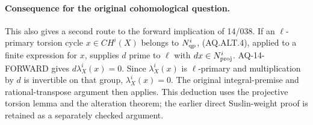 \paragraph{Consequence for the original cohomological question.}
This also gives a second route to the forward implication
of 14/038.  If an $\ell$-primary torsion cycle
$x\in CH^i(X)$ belongs to $N^i_{\rm qp}$, (AQ.ALT.4),
applied to a finite expression for $x$, supplies
$d$ prime to $\ell$ with $dx\in N^i_{\rm proj}$.
AQ-14-FORWARD gives $d\lambda_X^i(x)=0$.
Since $\lambda_X^i(x)$ is $\ell$-primary and
multiplication by $d$ is invertible on that group,
$\lambda_X^i(x)=0$.
The original integral-premise and rational-transpose
argument then applies.  This deduction uses the
projective torsion lemma and the alteration theorem;
the earlier direct Suslin-weight proof is retained
as a separately checked argument.

